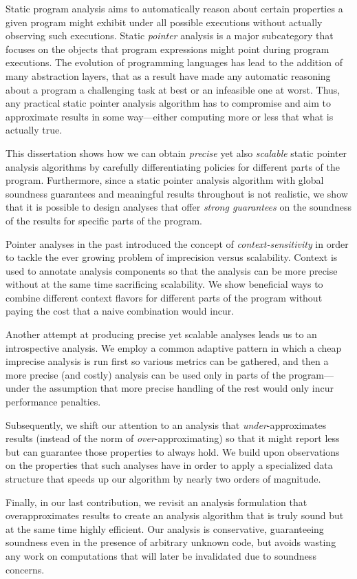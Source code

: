 Static program analysis aims to automatically reason about certain properties a given program might exhibit under all possible executions without actually observing such executions. Static \emph{pointer} analysis is a major subcategory that focuses on the objects that program expressions might point during program executions. The evolution of programming languages has lead to the addition of many abstraction layers, that as a result have made any automatic reasoning about a program a challenging task at best or an infeasible one at worst. Thus, any practical static pointer analysis algorithm has to compromise and aim to approximate results in some way---either computing more or less that what is actually true.

This dissertation shows how we can obtain \emph{precise} yet also \emph{scalable} static pointer analysis algorithms by carefully differentiating policies for different parts of the program. Furthermore, since a static pointer analysis algorithm with global soundness guarantees and meaningful results throughout is not realistic, we show that it is possible to design analyses that offer \emph{strong guarantees} on the soundness of the results for specific parts of the program.

Pointer analyses in the past introduced the concept of \emph{context-sensitivity} in order to tackle the ever growing problem of imprecision versus scalability. Context is used to annotate analysis components so that the analysis can be more precise without at the same time sacrificing scalability. We show beneficial ways to combine different context flavors for different parts of the program without paying the cost that a naive combination would incur.

Another attempt at producing precise yet scalable analyses leads us to an introspective analysis. We employ a common adaptive pattern in which a cheap imprecise analysis is run first so various metrics can be gathered, and then a more precise (and costly) analysis can be used only in parts of the program---under the assumption that more precise handling of the rest would only incur performance penalties.

Subsequently, we shift our attention to an analysis that \emph{under}-approximates results (instead of the norm of \emph{over}-approximating) so that it might report less but can guarantee those properties to always hold. We build upon observations on the properties that such analyses have in order to apply a specialized data structure that speeds up our algorithm by nearly two orders of magnitude.

Finally, in our last contribution, we revisit an analysis formulation that overapproximates results to create an analysis algorithm that is truly sound but at the same time highly efficient. Our analysis is conservative, guaranteeing soundness even in the presence of arbitrary unknown code, but avoids wasting any work on computations that will later be invalidated due to soundness concerns.
